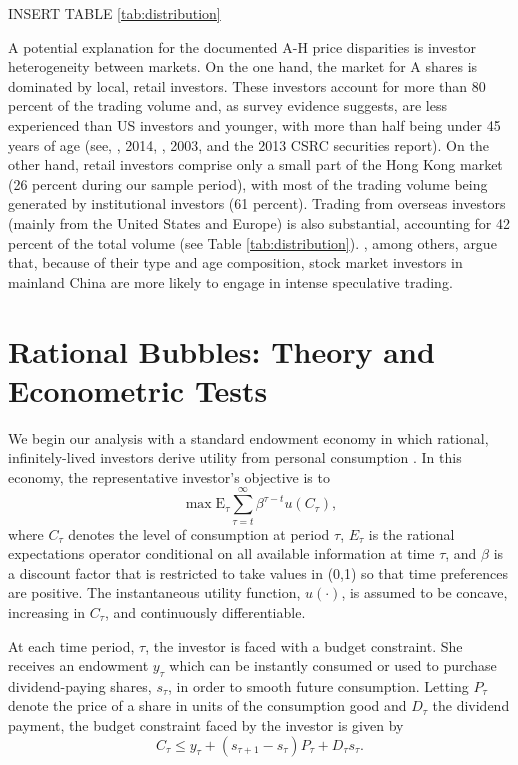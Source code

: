 \documentclass[11pt]{article}
\begin{document}
\bigskip
\begin{center}
INSERT TABLE \ref{tab:distribution}
\end{center}
\bigskip

A potential explanation for the documented A-H price disparities is investor heterogeneity between markets. On the one hand, the market for A shares is dominated by local, retail investors. These investors account for more than 80 percent of the trading volume and, as survey evidence suggests, are less experienced than US investors and younger, with more than half being under 45 years of age (see, \citeauthor{ganYJXMZ2014}, 2014, \citeauthor{fengS2003}, 2003,  and the 2013 CSRC securities report). On the other hand, retail investors comprise only a small part of the Hong Kong market (26 percent during our sample period), with most of the trading volume being generated by institutional investors (61 percent). Trading from overseas investors (mainly from the United States and Europe) is also substantial, accounting for 42 percent of the total volume (see Table \ref{tab:distribution}). \citet{meiSX2005}, among others, argue that, because of their type and age composition, stock market investors in mainland China are more likely to engage in intense speculative trading.


\section{Rational Bubbles: Theory and Econometric Tests}\label{sec:theory}

We begin our analysis with a standard endowment economy in which rational, infinitely-lived investors derive utility from personal consumption \citep{DibaG1988,Gurkaynak2008}. In this economy, the representative investor's objective is to
\begin{equation} \label{eq:maxfun}
\max \text{E}_{\tau} \sum_{\tau=t}^{\infty} \beta^{\tau-t} u(C_{\tau}),
\end{equation}
where $C_{\tau}$ denotes the level of consumption at period $\tau$, $E_{\tau}$ is the rational expectations operator conditional on all available information at time $\tau$, and $\beta$ is a discount factor that is restricted to take values in (0,1) so that time preferences are positive. The instantaneous utility function, $u(\cdot)$, is assumed to be concave, increasing in $C_{\tau}$, and continuously differentiable. 

At each time period, $\tau$, the investor is faced with a budget constraint. She receives an endowment $y_{\tau}$ which can be instantly consumed or used to purchase dividend-paying shares, $s_\tau$, in order to smooth future consumption. Letting $P_{\tau}$ denote the price of a share in units of the consumption good and $D_{\tau}$ the dividend payment, the budget constraint faced by the investor is given by
\begin{equation} \label{eq:constr}
C_{\tau} \leq y_{\tau}+(s_{\tau+1}-s_{\tau})P_{\tau}+D_{\tau} s_{\tau}.
\end{equation}
\end{document}
